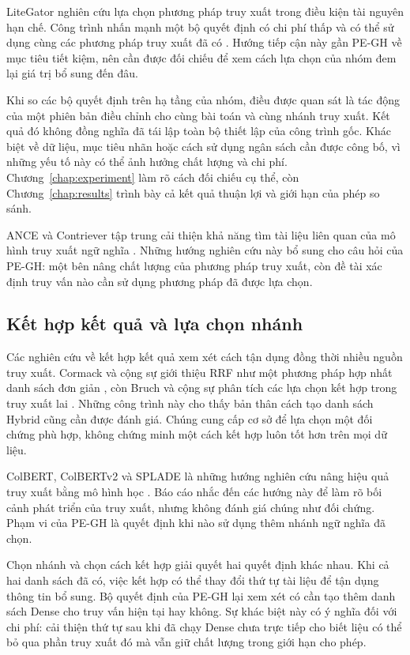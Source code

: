 LiteGator nghiên cứu lựa chọn phương pháp truy xuất trong điều kiện tài nguyên hạn chế. Công trình nhấn mạnh một bộ quyết định có chi phí thấp và có thể sử dụng cùng các phương pháp truy xuất đã có \cite{litegator2025}. Hướng tiếp cận này gần PE-GH về mục tiêu tiết kiệm, nên cần được đối chiếu để xem cách lựa chọn của nhóm đem lại giá trị bổ sung đến đâu.

Khi so các bộ quyết định trên hạ tầng của nhóm, điều được quan sát là tác động của một phiên bản điều chỉnh cho cùng bài toán và cùng nhánh truy xuất. Kết quả đó không đồng nghĩa đã tái lập toàn bộ thiết lập của công trình gốc. Khác biệt về dữ liệu, mục tiêu nhãn hoặc cách sử dụng ngân sách cần được công bố, vì những yếu tố này có thể ảnh hưởng chất lượng và chi phí. Chương~\ref{chap:experiment} làm rõ cách đối chiếu cụ thể, còn Chương~\ref{chap:results} trình bày cả kết quả thuận lợi và giới hạn của phép so sánh.

ANCE và Contriever tập trung cải thiện khả năng tìm tài liệu liên quan của mô hình truy xuất ngữ nghĩa \cite{ance2021,contriever2022}. Những hướng nghiên cứu này bổ sung cho câu hỏi của PE-GH: một bên nâng chất lượng của phương pháp truy xuất, còn đề tài xác định truy vấn nào cần sử dụng phương pháp đã được lựa chọn.

\subsection{Kết hợp kết quả và lựa chọn nhánh}
Các nghiên cứu về kết hợp kết quả xem xét cách tận dụng đồng thời nhiều nguồn truy xuất. Cormack và cộng sự giới thiệu RRF như một phương pháp hợp nhất danh sách đơn giản \cite{rrf2009}, còn Bruch và cộng sự phân tích các lựa chọn kết hợp trong truy xuất lai \cite{bruch2023}. Những công trình này cho thấy bản thân cách tạo danh sách Hybrid cũng cần được đánh giá. Chúng cung cấp cơ sở để lựa chọn một đối chứng phù hợp, không chứng minh một cách kết hợp luôn tốt hơn trên mọi dữ liệu.

ColBERT, ColBERTv2 và SPLADE là những hướng nghiên cứu nâng hiệu quả truy xuất bằng mô hình học \cite{colbert2020,colbertv2_2022,splade2021}. Báo cáo nhắc đến các hướng này để làm rõ bối cảnh phát triển của truy xuất, nhưng không đánh giá chúng như đối chứng. Phạm vi của PE-GH là quyết định khi nào sử dụng thêm nhánh ngữ nghĩa đã chọn.

Chọn nhánh và chọn cách kết hợp giải quyết hai quyết định khác nhau. Khi cả hai danh sách đã có, việc kết hợp có thể thay đổi thứ tự tài liệu để tận dụng thông tin bổ sung. Bộ quyết định của PE-GH lại xem xét có cần tạo thêm danh sách Dense cho truy vấn hiện tại hay không. Sự khác biệt này có ý nghĩa đối với chi phí: cải thiện thứ tự sau khi đã chạy Dense chưa trực tiếp cho biết liệu có thể bỏ qua phần truy xuất đó mà vẫn giữ chất lượng trong giới hạn cho phép.

